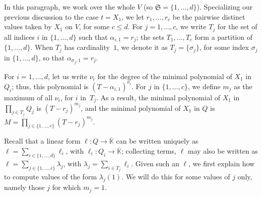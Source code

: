 \documentclass[12pt]{article}
\def\Kbar {{\ensuremath{\overline{\mathbb{K}}}}}
\begin{document}
In this paragraph, we work over the whole $V$ (so
$\mathfrak{S}=\{1,\dots,d\}$).  Specializing our previous discussion
to the case $t=X_1$, we let $r_1,\dots,r_c$ be the pairwise distinct
values taken by $X_1$ on $V$, for some $c \le d$.  For
$j=1,\dots,c$, we write $T_j$ for the set of all indices $i$ in
$\{1,\dots,d\}$ such that $\alpha_{i,1}=r_j$; the sets $T_1,\dots,T_c$
form a partition of $\{1,\dots,d\}$. When $T_j$ has cardinality~$1$,
we denote it as $T_j=\{\sigma_j\}$, for some index $\sigma_j$ in
$\{1,\dots,d\}$, so that $\alpha_{\sigma_j,1}=r_j$.

For $i=1,\dots,d$, let us write $\nu_i$ for the degree of the minimal
polynomial of $X_1$ in $Q_i$; thus, this polynomial is
$(T-\alpha_{i,1})^{\nu_i}$. For $j$ in $\{1,\dots,c\}$, we define
$m_j$ as the maximum of all $\nu_i$, for $i$ in~$T_j$. As a result, the minimal
polynomial of $X_1$ in $\prod_{j \in T_j} Q_j$ is 
$(T-r_j)^{m_j}$, and the minimal polynomial of $X_1$ in $Q$ is
$M=\prod_{j \in \{1,\dots,c\}} (T-r_j)^{m_j}$.

Recall that a linear form $\ell: Q \to \Kbar$ can be written uniquely
as $\ell=\sum_{i\in \{1,\dots,d\}} \ell_i$, with $\ell_i:Q_i \to
\Kbar$; collecting terms, $\ell$ may also be written as $\ell=\sum_{j
	\in \{1,\dots,c\}} \lambda_j$, with $\lambda_j=\sum_{i \in T_j}
\ell_i$.  Given such an $\ell$, we first explain how to compute values
of the form $\lambda_j(1)$. We will do this for some values of $j$
only, namely those $j$ for which $m_j=1$.
\end{document}
